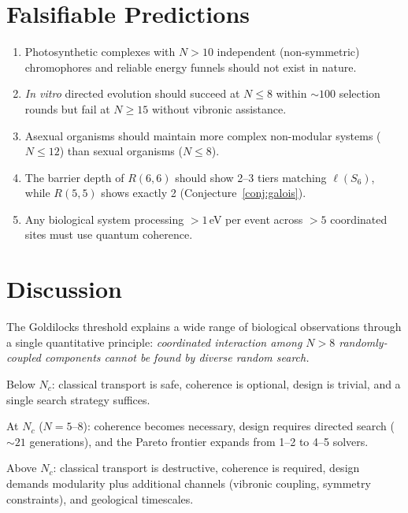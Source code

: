\documentclass[11pt]{amsart}
\theoremstyle{definition}
\begin{document}
\section{Falsifiable Predictions}
\label{sec:predictions}

\begin{enumerate}[label=\textbf{P\arabic*.}]
\item Photosynthetic complexes with $N > 10$ independent (non-symmetric) chromophores and reliable energy funnels should not exist in nature.
\item \emph{In vitro} directed evolution should succeed at $N \leq 8$ within $\sim 100$ selection rounds but fail at $N \geq 15$ without vibronic assistance.
\item Asexual organisms should maintain more complex non-modular systems ($N \leq 12$) than sexual organisms ($N \leq 8$).
\item The barrier depth of $R(6,6)$ should show 2--3 tiers matching $\ell(S_6)$, while $R(5,5)$ shows exactly 2 (Conjecture~\ref{conj:galois}).
\item Any biological system processing $> 1$\,eV per event across $> 5$ coordinated sites must use quantum coherence.
\end{enumerate}


\section{Discussion}
\label{sec:discussion}

The Goldilocks threshold explains a wide range of biological observations through a single quantitative principle: \emph{coordinated interaction among $N > 8$ randomly-coupled components cannot be found by diverse random search.}

Below $N_c$: classical transport is safe, coherence is optional, design is trivial, and a single search strategy suffices.

At $N_c$ ($N = 5$--$8$): coherence becomes necessary, design requires directed search ($\sim 21$ generations), and the Pareto frontier expands from 1--2 to 4--5 solvers.

Above $N_c$: classical transport is destructive, coherence is required, design demands modularity plus additional channels (vibronic coupling, symmetry constraints), and geological timescales.
\end{document}
